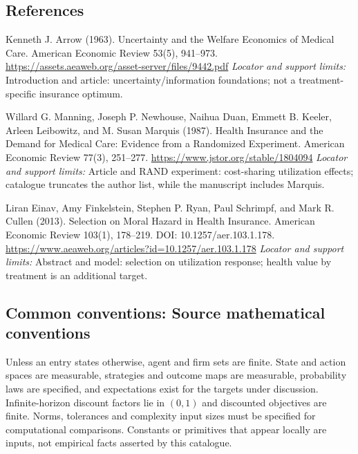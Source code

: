 \documentclass[11pt,a4paper]{article}
\begin{document}
\subsection*{References}
\begin{enumerate}[label={[S\arabic*]},leftmargin=*,itemsep=0.6em]
\item Kenneth J. Arrow (1963). Uncertainty and the Welfare Economics of Medical Care. American Economic Review 53(5), 941--973.
\url{https://assets.aeaweb.org/asset-server/files/9442.pdf}
\newline\emph{Locator and support limits:} Introduction and article: uncertainty/information foundations; not a treatment-specific insurance optimum.
\item Willard G. Manning, Joseph P. Newhouse, Naihua Duan, Emmett B. Keeler, Arleen Leibowitz, and M. Susan Marquis (1987). Health Insurance and the Demand for Medical Care: Evidence from a Randomized Experiment. American Economic Review 77(3), 251--277.
\url{https://www.jstor.org/stable/1804094}
\newline\emph{Locator and support limits:} Article and RAND experiment: cost-sharing utilization effects; catalogue truncates the author list, while the manuscript includes Marquis.
\item Liran Einav, Amy Finkelstein, Stephen P. Ryan, Paul Schrimpf, and Mark R. Cullen (2013). Selection on Moral Hazard in Health Insurance. American Economic Review 103(1), 178--219. DOI: 10.1257/aer.103.1.178.
\url{https://www.aeaweb.org/articles?id=10.1257/aer.103.1.178}
\newline\emph{Locator and support limits:} Abstract and model: selection on utilization response; health value by treatment is an additional target.
\end{enumerate}

\subsection*{Common conventions: Source mathematical conventions}

Unless an entry states otherwise, agent and firm sets are finite. State and action spaces are measurable, strategies and outcome maps are measurable, probability laws are specified, and expectations exist for the targets under discussion. Infinite-horizon discount factors lie in $(0,1)$ and discounted objectives are finite. Norms, tolerances and complexity input sizes must be specified for computational comparisons. Constants or primitives that appear locally are inputs, not empirical facts asserted by this catalogue.
\end{document}
